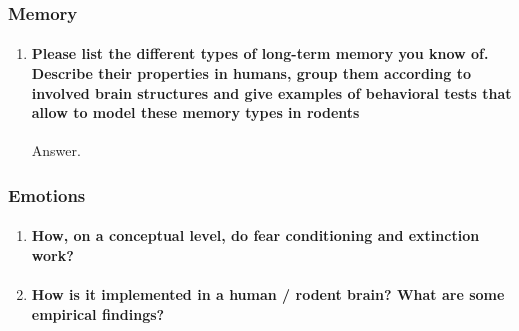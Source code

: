 \documentclass[12pt,article,oneside,a4paper]{memoir}
\begin{document}
\subsubsection{Memory}
\begin{enumerate}
\item \paragraph{Please list the different types of long-term memory you know of. Describe their properties in humans, group them according to involved brain structures and give examples of behavioral tests that allow to model these memory types in rodents} \label{question:long-term-memory}

Answer.
\end{enumerate}

\subsubsection{Emotions}
\begin{enumerate}
\item \paragraph{How, on a conceptual level, do fear conditioning and extinction work?}
\item \paragraph{How is it implemented in a human / rodent brain?  What are some empirical findings?}
\end{enumerate}

\end{document}
